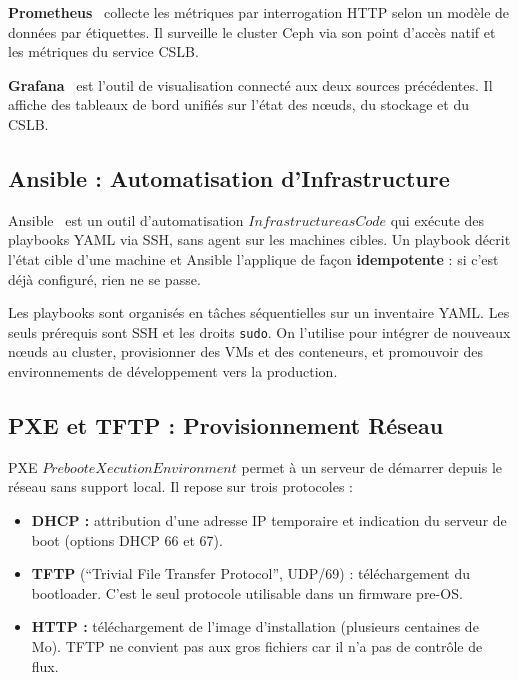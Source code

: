\par \textbf{Prometheus}~\cite{refPrometheus} collecte les métriques par interrogation HTTP selon un modèle de données par étiquettes. Il surveille le cluster Ceph via son point d'accès natif et les métriques du service CSLB.\\

\par \textbf{Grafana}~\cite{ref25} est l'outil de visualisation connecté aux deux sources précédentes. Il affiche des tableaux de bord unifiés sur l'état des n\oe{}uds, du stockage et du CSLB.\\

\subsection{Ansible : Automatisation d'Infrastructure}

\par Ansible~\cite{refAnsible} est un outil d'automatisation \(Infrastructure as Code\) qui exécute des playbooks YAML via SSH, sans agent sur les machines cibles. Un playbook décrit l'état cible d'une machine et Ansible l'applique de façon \textbf{idempotente} : si c'est déjà configuré, rien ne se passe.

\par Les playbooks sont organisés en tâches séquentielles sur un inventaire YAML. Les seuls prérequis sont SSH et les droits \texttt{sudo}. On l'utilise pour intégrer de nouveaux n\oe{}uds au cluster, provisionner des VMs et des conteneurs, et promouvoir des environnements de développement vers la production.

\subsection{PXE et TFTP : Provisionnement Réseau}

\par PXE \(Preboot eXecution Environment\) permet à un serveur de démarrer depuis le réseau sans support local. Il repose sur trois protocoles :\\

\begin{itemize}
    \item \textbf{DHCP :} attribution d'une adresse IP temporaire et indication du serveur de boot (options DHCP 66 et 67).
    \item \textbf{TFTP} (``Trivial File Transfer Protocol'', UDP/69) : téléchargement du bootloader. C'est le seul protocole utilisable dans un firmware pre-OS.
    \item \textbf{HTTP :} téléchargement de l'image d'installation (plusieurs centaines de Mo). TFTP ne convient pas aux gros fichiers car il n'a pas de contrôle de flux.
\end{itemize}

